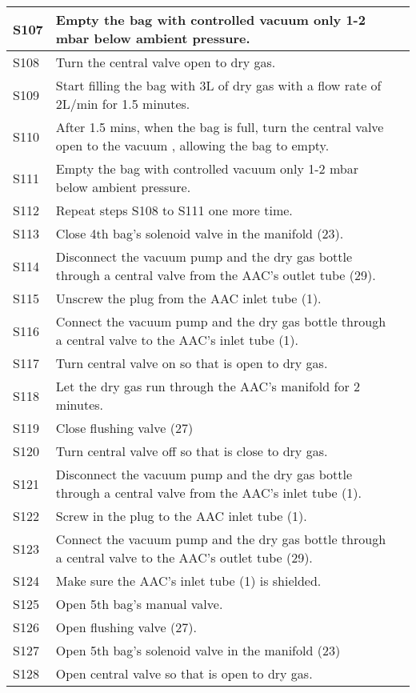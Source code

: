 \begin{longtable} {|m{}|m{}|m{}|}
S107 & Empty the bag with controlled vacuum only 1-2 mbar below ambient pressure. & \\ \hline
S108 & Turn the central valve open to dry gas. & \\ \hline
S109 & Start filling the bag with 3L of dry gas with a flow rate of 2L/min for 1.5 minutes. & \\ \hline
S110 & After 1.5 mins, when the bag is full, turn the central valve open to the vacuum , allowing the bag to empty. & \\ \hline
S111 & Empty the bag with controlled vacuum only 1-2 mbar below ambient pressure. & \\ \hline
S112 & Repeat steps S108 to S111 one more time. & \\ \hline
S113 & Close 4th bag's solenoid valve in the manifold (23). & \\ \hline
S114 & Disconnect the vacuum pump and the dry gas bottle through a central valve from the AAC's outlet tube (29). & \\ \hline
S115 & Unscrew the plug from the AAC inlet tube (1). & \\ \hline
S116 & Connect the vacuum pump and the dry gas bottle through a central valve to the AAC's inlet tube (1). & \\ \hline
S117 & Turn central valve on so that is open to dry gas. & \\ \hline
S118 & Let the dry gas run through the AAC's manifold for 2 minutes. & \\ \hline
S119 & Close flushing valve (27) & \\ \hline
S120 & Turn central valve off so that is close to dry gas. & \\ \hline
S121 & Disconnect the vacuum pump and the dry gas bottle through a central valve from the AAC's inlet tube (1). & \\ \hline
S122 & Screw in the plug to the AAC inlet tube (1). & \\ \hline
S123 & Connect the vacuum pump and the dry gas bottle through a central valve to the AAC's outlet tube (29). & \\ \hline
S124 & Make sure the AAC's inlet tube (1) is shielded. & \\ \hline
S125 & Open 5th bag's manual valve. & \\ \hline
S126 & Open flushing valve (27). & \\ \hline
S127 & Open 5th bag's solenoid valve in the manifold (23) & \\ \hline
S128 & Open central valve so that is open to dry gas. & \\ \hline

\end{longtable}
